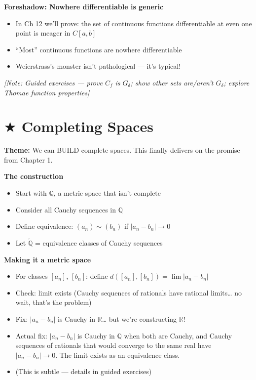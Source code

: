 \documentclass[
  10pt,
  letterpaper,
]{scrbook}
\providecommand{\tightlist}{%
  \setlength{\itemsep}{0pt}\setlength{\parskip}{0pt}}
\begin{document}
\textbf{Foreshadow: Nowhere differentiable is generic}

\begin{itemize}
\tightlist
\item
  In Ch 12 we'll prove: the set of continuous functions differentiable
  at even one point is meager in \(C[a,b]\)
\item
  ``Most'' continuous functions are nowhere differentiable
\item
  Weierstrass's monster isn't pathological --- it's typical!
\end{itemize}

\emph{{[}Note: Guided exercises --- prove \(C_f\) is \(G_\delta\); show
other sets are/aren't \(G_\delta\); explore Thomae function
properties{]}}

\section{\texorpdfstring{\(\bigstar\) Completing
Spaces}{\textbackslash bigstar Completing Spaces}}\label{bigstar-completing-spaces}

\textbf{Theme:} We can BUILD complete spaces. This finally delivers on
the promise from Chapter 1.

\textbf{The construction}

\begin{itemize}
\tightlist
\item
  Start with \(\mathbb{Q}\), a metric space that isn't complete
\item
  Consider all Cauchy sequences in \(\mathbb{Q}\)
\item
  Define equivalence: \((a_n) \sim (b_n)\) if \(|a_n - b_n| \to 0\)
\item
  Let \(\tilde{\mathbb{Q}}\) = equivalence classes of Cauchy sequences
\end{itemize}

\textbf{Making it a metric space}

\begin{itemize}
\tightlist
\item
  For classes \([a_n]\), \([b_n]\): define
  \(d([a_n], [b_n]) = \lim |a_n - b_n|\)
\item
  Check: limit exists (Cauchy sequences of rationals have rational
  limits\ldots{} no wait, that's the problem)
\item
  Fix: \(|a_n - b_n|\) is Cauchy in \(\mathbb{R}\)\ldots{} but we're
  constructing \(\mathbb{R}\)!
\item
  Actual fix: \(|a_n - b_n|\) is Cauchy in \(\mathbb{Q}\) when both are
  Cauchy, and Cauchy sequences of rationals that would converge to the
  same real have \(|a_n - b_n| \to 0\). The limit exists as an
  equivalence class.
\item
  (This is subtle --- details in guided exercises)
\end{itemize}
\end{document}
